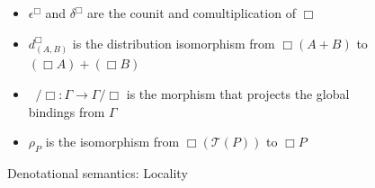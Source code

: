 \documentclass[acmsmall, screen, review, anonymous]{acmart}
\theoremstyle{definition}
\newcommand{\glob}{\mathop{\Box}}
\newcommand{\counit}[1]{\epsilon^{#1}}
\newcommand{\comult}[1]{\delta^{#1}}
\newcommand{\ununit}{\rho}
\newcommand{\mon}{\mathcal{T}}
\newcommand{\gdist}[2]{d^{\Box}_{(#1, #2)}}
\newcommand{\types}{\mathrel{:}}
\newcommand{\cdiv}[1]{#1/\Box}
\newcommand{\bdiv}[1]{\cdiv{\mathop{!_{#1}}}}
\begin{document}
\begin{figure}
\begin{itemize}
\item $\counit{\glob}$ and $\comult{\glob}$ are the counit and
  comultiplication of $\glob$
\item $\gdist{A}{B}$ is the distribution isomorphism from
  $\glob (A + B)$ to $(\glob A) + (\glob B)$
\item $\bdiv{\Gamma} \types \Gamma \rightarrow \cdiv{\Gamma}$ is the morphism
that projects the global bindings from $\Gamma$
\item $\ununit_P$ is the isomorphism from $\glob (\mon(P))$ to $\glob P$
\end{itemize}
\caption{Denotational semantics: Locality}
\label{fig:denotational-locality}
\end{figure}
\end{document}
